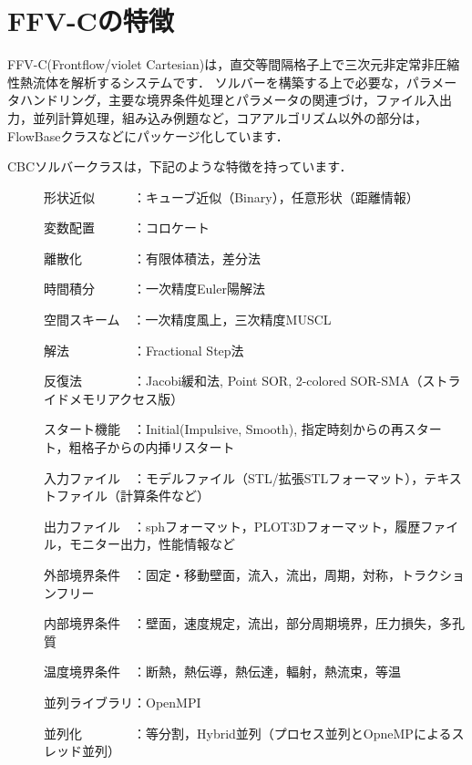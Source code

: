\graphicspath{{./fig_intro/}}


%
\section{FFV-Cの特徴}
FFV-C(Frontflow/violet Cartesian)は，直交等間隔格子上で三次元非定常非圧縮性熱流体を解析するシステムです．
ソルバーを構築する上で必要な，パラメータハンドリング，主要な境界条件処理とパラメータの関連づけ，ファイル入出力，並列計算処理，組み込み例題など，コアアルゴリズム以外の部分は，FlowBaseクラスなどにパッケージ化しています．

CBCソルバークラスは，下記のような特徴を持っています．

\begin{description}
\item[ ] 形状近似　　　：キューブ近似（Binary），任意形状（距離情報）
\item[ ] 変数配置　　　：コロケート
\item[ ] 離散化　　　　：有限体積法，差分法
\item[ ] 時間積分　　　：一次精度Euler陽解法%
\item[ ] 空間スキーム　：一次精度風上，三次精度MUSCL%
\item[ ] 解法　　　　　：Fractional Step法
\item[ ] 反復法　　　　：Jacobi緩和法, Point SOR, 2-colored SOR-SMA（ストライドメモリアクセス版）
\item[ ] スタート機能　：Initial(Impulsive, Smooth), 指定時刻からの再スタート，粗格子からの内挿リスタート
\item[ ] 入力ファイル　：モデルファイル（STL/拡張STLフォーマット），テキストファイル（計算条件など）
\item[ ] 出力ファイル　：sphフォーマット，PLOT3Dフォーマット，履歴ファイル，モニター出力，性能情報など
\item[ ] 外部境界条件　：固定・移動壁面，流入，流出，周期，対称，トラクションフリー
\item[ ] 内部境界条件　：壁面，速度規定，流出，部分周期境界，圧力損失，多孔質
\item[ ] 温度境界条件　：断熱，熱伝導，熱伝達，輻射，熱流束，等温
\item[ ] 並列ライブラリ：OpenMPI
\item[ ] 並列化　　　　：等分割，Hybrid並列（プロセス並列とOpneMPによるスレッド並列）

\end{description}
